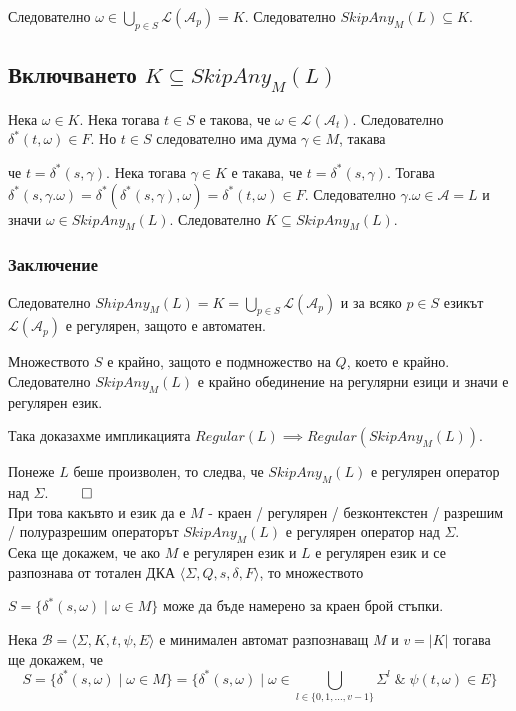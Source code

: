 \documentclass[12pt]{article}
\begin{document}
Следователно \(\omega \in \displaystyle\bigcup_{p \in S} \mathcal{L}(\mathcal{A}_p) = K\).
Следователно \(SkipAny_M(L) \subseteq K\).

\subsection*{Включването \(K \subseteq SkipAny_M(L)\)}
Нека \(\omega \in K\). Нека тогава \(t \in S\) е такова, че \(\omega \in \mathcal{L}(\mathcal{A}_t)\).
Следователно \(\delta^*(t, \omega) \in F\). Но \(t \in S\) следователно има дума \(\gamma \in M\), такава

че \(t = \delta^*(s, \gamma)\). Нека тогава \(\gamma \in K\) е такава, че \(t = \delta^*(s, \gamma)\).
Тогава \(\delta^*(s, \gamma.\omega) = \delta^*(\delta^*(s, \gamma), \omega) = \delta^*(t, \omega) \in F\).
Следователно \(\gamma.\omega \in \mathcal{A} = L\) и значи \(\omega \in SkipAny_M(L)\).
Следователно \(K \subseteq SkipAny_M(L)\).

\subsubsection*{Заключение}
Следователно \(ShipAny_M(L) = K = \displaystyle\bigcup_{p \in S} \mathcal{L}(\mathcal{A}_p)\) и за всяко \(p \in S\) езикът \(\mathcal{L}(\mathcal{A}_p)\) е регулярен, защото е автоматен.

Множеството \(S\) е крайно, защото е подмножество на \(Q\), което е крайно.
Следователно \(SkipAny_M(L)\) е крайно обединение на регулярни езици и значи е регулярен език.

Така доказахме импликацията \(Regular(L) \implies Regular(SkipAny_M(L))\).

Понеже \(L\) беше произволен, то следва, че \(SkipAny_M(L)\) е регулярен оператор над \(\Sigma\). \(\qed\) \\

При това какъвто и език да е \(M\) - краен / регулярен / безконтекстен / разрешим / полуразрешим операторът \(SkipAny_M(L)\) е регулярен оператор над \(\Sigma\). \\

Сека ще докажем, че ако \(M\) е регулярен език и \(L\) е регулярен език и се разпознава от тотален ДКА \(\langle \Sigma, Q, s, \delta, F \rangle\), то множеството

\(S = \{\delta^*(s, \omega) \mid \omega \in M\}\) може да бъде намерено за краен брой стъпки.

Нека \(\mathcal{B} = \langle \Sigma, K, t, \psi, E \rangle\) е минимален автомат разпознаващ \(M\) и \(v = |K|\)
тогава ще докажем, че \[S = \{\delta^*(s, \omega) \mid \omega \in M\} = \{\delta^*(s, \omega) \mid \omega \in \displaystyle\bigcup_{l \in \{0, 1, \dots, v - 1\}} \Sigma^l \;\&\; \psi(t, \omega) \in E \}\]
\end{document}
